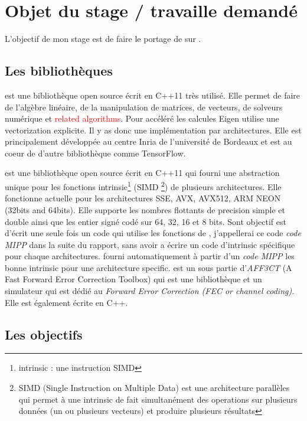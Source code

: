 \section{Objet du stage / travaille demandé}

L'objectif de mon stage est de faire le portage de \Eigen sur \MIPP.

\subsection{Les bibliothèques}

\Eigen est une bibliothèque open source écrit en C++11 très utilisé. Elle permet
de faire de l'algèbre linéaire, de la manipulation de matrices, de vecteurs,
de solveurs numérique et \textcolor{red}{related algorithms}. Pour accéléré les calcules
Eigen utilise une vectorization explicite. Il y as donc une implémentation par
architectures. Elle est principalement développée au centre Inria de l'université de
Bordeaux et est au coeur de d'autre bibliothèque comme TensorFlow.


\MIPP est une bibliothèque open source écrit en C++11 qui fourni une abstraction
unique pour les fonctions intrinsic\footnote{intrinsic : une instruction SIMD} (SIMD
\footnote{SIMD (Single Instruction on Multiple Data) est une architecture parallèles
qui permet à une intrinsic de fait simultanément des operations sur plusieurs données
(un ou plusieurs vecteurs) et produire plusieurs résultats}) de plusieurs architectures.
Elle fonctionne actuelle pour les architectures SSE, AVX, AVX512, ARM NEON (32bits and
64bits). Elle supporte les nombres flottants de precision simple et double ainsi que les
entier signé codé sur 64, 32, 16 et 8 bits. Sont objectif est d'écrit une seule fois un
code qui utilise les fonctions de \MIPP, j'appellerai ce code \emph{code MIPP} dans
la suite du rapport, sans avoir a écrire un code d'intrinsic spécifique pour chaque
architectures. \MIPP fourni automatiquement à partir d'un \emph{code MIPP} les
bonne intrinsic pour une architecture specific. \MIPP est un sous partie
d'\emph{AFF3CT} (A Fast Forward Error Correction Toolbox) qui est une bibliothèque et un
simulateur qui est dédié au \emph{Forward Error Correction (FEC or channel coding)}. Elle
est également écrite en C++.

\subsection{Les objectifs}

